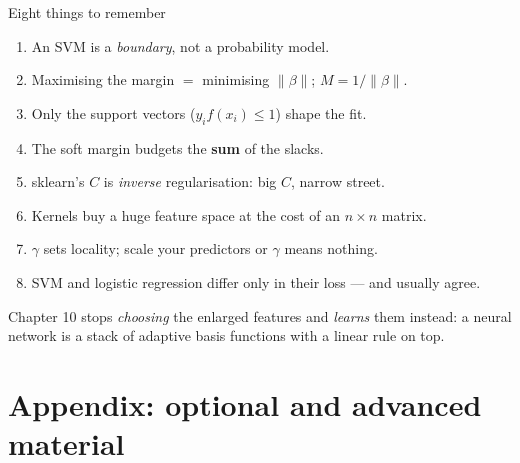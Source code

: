 \documentclass[aspectratio=169,11pt]{beamer}
\begin{document}
\begin{frame}{Eight things to remember}
  \footnotesize
  \begin{takeaway}
    \begin{enumerate}
      \item An SVM is a \emph{boundary}, not a probability model.
      \item Maximising the margin $=$ minimising $\|\beta\|$; $M=1/\|\beta\|$.
      \item Only the support vectors ($y_if(x_i)\le1$) shape the fit.
      \item The soft margin budgets the \textbf{sum} of the slacks.
      \item sklearn's $C$ is \emph{inverse} regularisation: big $C$, narrow
            street.
      \item Kernels buy a huge feature space at the cost of an $n\times n$
            matrix.
      \item $\gamma$ sets locality; scale your predictors or $\gamma$ means
            nothing.
      \item SVM and logistic regression differ only in their loss --- and
            usually agree.
    \end{enumerate}
  \end{takeaway}
  \begin{takeaway}
    Chapter 10 stops \emph{choosing} the enlarged features and \emph{learns}
    them instead: a neural network is a stack of adaptive basis functions with a
    linear rule on top.
  \end{takeaway}
\end{frame}

\appendix
\AtBeginSection[]{}
\section{Appendix: optional and advanced material}
\end{document}

